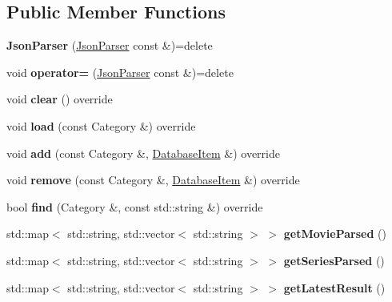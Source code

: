 \subsection*{Public Member Functions}
\begin{DoxyCompactItemize}
\item 
\mbox{\label{classJsonParser_af6b90af892f999ee37dfc57bc0a7851f}} 
{\bfseries Json\+Parser} (\hyperlink{classJsonParser}{Json\+Parser} const \&)=delete
\item 
\mbox{\label{classJsonParser_ab4f43720d31047a61275598769b30e7d}} 
void {\bfseries operator=} (\hyperlink{classJsonParser}{Json\+Parser} const \&)=delete
\item 
\mbox{\label{classJsonParser_a1d091b22b4f95ea1c16e9d09b644715e}} 
void {\bfseries clear} () override
\item 
\mbox{\label{classJsonParser_abd179a463a5ce61bad930af35bf414d8}} 
void {\bfseries load} (const Category \&) override
\item 
\mbox{\label{classJsonParser_a9ab6146344e60e607289dafe2609c4e5}} 
void {\bfseries add} (const Category \&, \hyperlink{classDatabaseItem}{Database\+Item} \&) override
\item 
\mbox{\label{classJsonParser_ad49a8004db93e654df391bac2d98c5cc}} 
void {\bfseries remove} (const Category \&, \hyperlink{classDatabaseItem}{Database\+Item} \&) override
\item 
\mbox{\label{classJsonParser_af5641c4ab20251540d9c9f7a8d182efb}} 
bool {\bfseries find} (Category \&, const std\+::string \&) override
\item 
\mbox{\label{classJsonParser_a06078f0464569dac47c5d66131a4f8a4}} 
std\+::map$<$ std\+::string, std\+::vector$<$ std\+::string $>$ $>$ {\bfseries get\+Movie\+Parsed} ()
\item 
\mbox{\label{classJsonParser_ac942ea55db61a23fd1c6106b76ad1fa4}} 
std\+::map$<$ std\+::string, std\+::vector$<$ std\+::string $>$ $>$ {\bfseries get\+Series\+Parsed} ()
\item 
\mbox{\label{classJsonParser_ab23dd51f8c905cc86d2ad0b9bf232aeb}} 
std\+::map$<$ std\+::string, std\+::vector$<$ std\+::string $>$ $>$ {\bfseries get\+Latest\+Result} ()
\end{DoxyCompactItemize}
